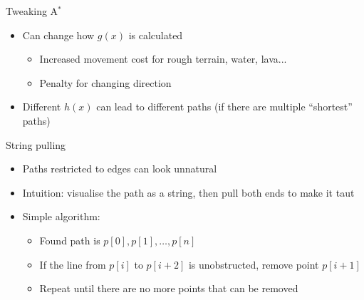 \begin{frame}{Tweaking A$^*$}
	\begin{itemize}
		\pause\item Can change how $g(x)$ is calculated
			\begin{itemize}
				\pause\item Increased movement cost for rough terrain, water, lava...
				\pause\item Penalty for changing direction
			\end{itemize}
		\pause\item Different $h(x)$ can lead to different paths (if there are multiple ``shortest'' paths)
	\end{itemize}
\end{frame}

\begin{frame}{String pulling}
	\begin{itemize}
		\pause\item Paths restricted to edges can look unnatural
		\pause\item Intuition: visualise the path as a string, then pull both ends to make it taut
		\pause\item Simple algorithm:
			\begin{itemize}
				\pause\item Found path is $p[0], p[1], \dots, p[n]$
				\pause\item If the line from $p[i]$ to $p[i+2]$ is unobstructed, remove point $p[i+1]$
				\pause\item Repeat until there are no more points that can be removed
			\end{itemize}
	\end{itemize}
\end{frame}

